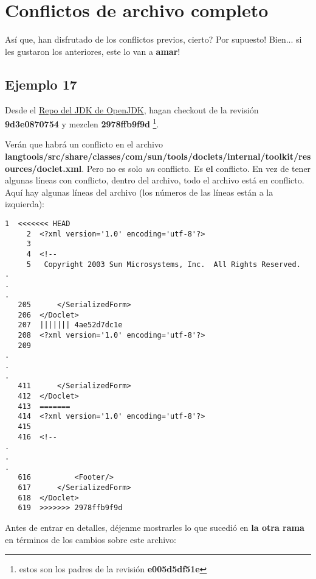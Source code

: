 
\section{Conflictos de archivo completo}

Así que, han disfrutado de los conflictos previos, cierto? Por supuesto! Bien... si les gustaron los anteriores, este lo van a {\bf amar}!

\subsection{Ejemplo 17}

Desde el \hyperref[openjdk_repo]{Repo del JDK de OpenJDK}, hagan checkout de la revisión {\bf 9d3e0870754} y mezclen {\bf 2978ffb9f9d}
\footnote{estos son los padres de la revisión {\bf e005d5df51e}}.

Verán que habrá un conflicto en el archivo {\bf langtools/src/share/classes/com/sun/tools/doclets/internal/toolkit/resources/doclet.xml}.
Pero no es solo {\it un} conflicto. Es {\bf el} conflicto. En vez de tener algunas líneas con conflicto, dentro del archivo,
todo el archivo está en conflicto. Aquí hay algunas líneas del archivo (los números de las líneas están a la izquierda):

\begin{lstlisting}[style=console_style,
	basicstyle=\small,
	caption={\bf Ejemplo 17} - Archivo en conflicto]
     1  <<<<<<< HEAD
     2  <?xml version='1.0' encoding='utf-8'?>
     3  
     4  <!--
     5   Copyright 2003 Sun Microsystems, Inc.  All Rights Reserved.
.
.
.
   205      </SerializedForm>
   206  </Doclet>
   207  ||||||| 4ae52d7dc1e
   208  <?xml version='1.0' encoding='utf-8'?>
   209  
.
.
.
   411      </SerializedForm>
   412  </Doclet>
   413  =======
   414  <?xml version='1.0' encoding='utf-8'?>
   415  
   416  <!--
.
.
.
   616          <Footer/>
   617      </SerializedForm>
   618  </Doclet>
   619  >>>>>>> 2978ffb9f9d
\end{lstlisting}

Antes de entrar en detalles, déjenme mostrarles lo que sucedió en {\bf la otra rama} en términos de los cambios sobre este archivo:

